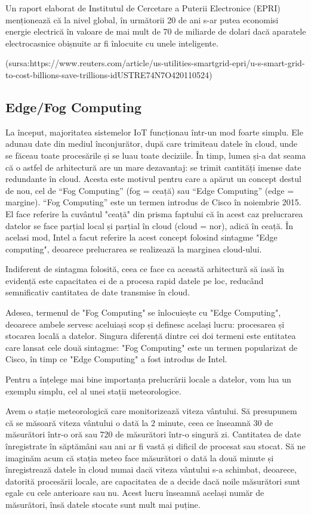 Un raport elaborat de Institutul de Cercetare a Puterii Electronice (EPRI)
menționează că la nivel global, în următorii 20 de ani s-ar putea economisi
energie electrică în valoare de mai mult de 70 de miliarde de dolari dacă
aparatele electrocasnice obișnuite ar fi înlocuite cu unele inteligente.

(sursa:https://www.reuters.com/article/us-utilities-smartgrid-epri/u-s-smart-grid-to-cost-billions-save-trillions-idUSTRE74N7O420110524)

\subsection{Edge/Fog Computing}
\label{sec:embed-iot-edge}

La început, majoritatea sistemelor IoT funcționau într-un mod foarte simplu. Ele
adunau date din mediul înconjurător, după care trimiteau datele în cloud, unde
se făceau toate procesările și se luau toate deciziile. În timp, lumea și-a dat
seama că o astfel de arhitectură are un mare dezavantaj: se trimit cantități
imense date redundante în cloud. Acesta este motivul pentru care a apărut un
concept destul de nou, cel de “Fog Computing” (fog = ceață) sau “Edge Computing”
(edge = margine). “Fog Computing” este un termen introdus de Cisco în noiembrie
2015. El face referire la cuvântul "ceață" din prisma faptului că în acest caz
prelucrarea datelor se face parțial local și parțial în cloud (cloud = nor),
adică în ceață. În acelasi mod, Intel a facut referire la acest concept folosind
sintagme "Edge computing", deoarece prelucrarea se realizează la marginea
cloud-ului.

Indiferent de sintagma folosită, ceea ce face ca această arhitectură să iasă în
evidență este capacitatea ei de a procesa rapid datele pe loc, reducând
semnificativ cantitatea de date transmise în cloud.

Adesea, termenul de "Fog Computing" se înlocuiește cu "Edge Computing", deoarece
ambele servesc aceluiași scop și definesc același lucru: procesarea și stocarea
locală a datelor. Singura diferență dintre cei doi termeni este entitatea care
lansat cele două sintagme: "Fog Computing" este un termen popularizat de Cisco,
în timp ce "Edge Computing" a fost introdus de Intel.

Pentru a înțelege mai bine importanța prelucrării locale a datelor, vom lua un
exemplu simplu, cel al unei stații meteorologice.

Avem o stație meteorologică care monitorizează viteza vântului. Să presupunem că
se măsoară viteza vântului o dată la 2 minute, ceea ce înseamnă 30 de măsurători
într-o oră sau 720 de măsurători într-o singură zi. Cantitatea de date
înregistrate în săptămâni sau ani ar fi vastă și dificil de procesat sau stocat.
Să ne imaginăm acum că stația meteo face măsurători o dată la două minute și
înregistrează datele în cloud numai dacă viteza vântului s-a schimbat, deoarece,
datorită procesării locale, are capacitatea de a decide dacă noile măsurători
sunt egale cu cele anterioare sau nu. Acest lucru înseamnă același număr de
măsurători, însă datele stocate sunt mult mai puține.

